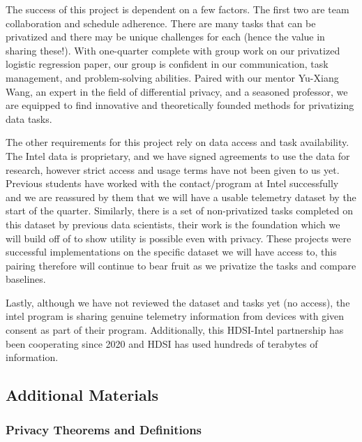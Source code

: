 \documentclass[12pt,letterpaper]{article}
\begin{document}
The success of this project is dependent on a few factors. The first two are team collaboration and schedule adherence. There are many tasks that can be privatized and there may be unique challenges for each (hence the value in sharing these!). With one-quarter complete with group work on our privatized logistic regression paper, our group is confident in our communication, task management, and problem-solving abilities. Paired with our mentor Yu-Xiang Wang, an expert in the field of differential privacy, and a seasoned professor, we are equipped to find innovative and theoretically founded methods for privatizing data tasks.

The other requirements for this project rely on data access and task availability. The Intel data is proprietary, and we have signed agreements to use the data for research, however strict access and usage terms have not been given to us yet. Previous students have worked with the contact/program at Intel successfully and we are reassured by them that we will have a usable telemetry dataset by the start of the quarter.  Similarly, there is a set of non-privatized tasks completed on this dataset by previous data scientists, their work is the foundation which we will build off of to show utility is possible even with privacy. These projects were successful implementations on the specific dataset we will have access to, this pairing therefore will continue to bear fruit as we privatize the tasks and compare baselines. 

Lastly, although we have not reviewed the dataset and tasks yet (no access), the intel program is sharing genuine telemetry information from devices with given consent as part of their program. Additionally, this HDSI-Intel partnership has been cooperating since 2020 and HDSI has used hundreds of terabytes of information.

\subsection{Additional Materials}

\subsubsection{Privacy Theorems and Definitions}
\end{document}
